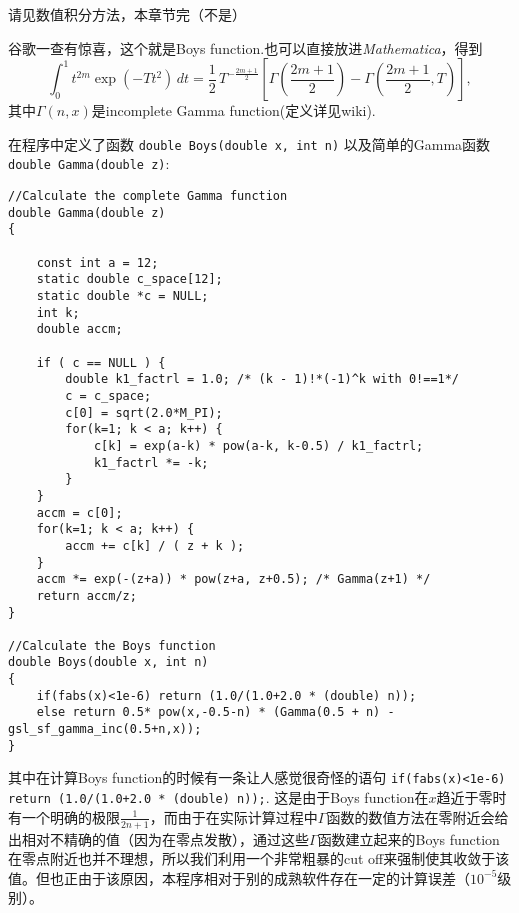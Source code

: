 \documentclass[12pt,a4paper,openany,twoside]{article}
\numberwithin{equation}{section}
\begin{document}
                请见数值积分方法，本章节完（不是）

                谷歌一查有惊喜，这个就是Boys function.也可以直接放进\emph{Mathematica}，得到
                \begin{equation}
                    \int _0^1 t^{2m} \exp(-Tt^2) \, dt = \frac{1}{2} \, T^{-\frac{2m+1}{2}}\left[\Gamma\left(\frac{2m+1}{2}\right) -  \Gamma\left(\frac{2m+1}{2},T\right)\right],
                \end{equation}
                其中$\Gamma(n,x)$是incomplete Gamma function(定义详见wiki).

                在程序中定义了函数 \lstinline$double Boys(double x, int n)$ 以及简单的Gamma函数 \lstinline$double Gamma(double z)$:
                \begin{lstlisting}
//Calculate the complete Gamma function
double Gamma(double z)
{

    const int a = 12;
    static double c_space[12];
    static double *c = NULL;
    int k;
    double accm;

    if ( c == NULL ) {
        double k1_factrl = 1.0; /* (k - 1)!*(-1)^k with 0!==1*/
        c = c_space;
        c[0] = sqrt(2.0*M_PI);
        for(k=1; k < a; k++) {
            c[k] = exp(a-k) * pow(a-k, k-0.5) / k1_factrl;
            k1_factrl *= -k;
        }
    }
    accm = c[0];
    for(k=1; k < a; k++) {
        accm += c[k] / ( z + k );
    }
    accm *= exp(-(z+a)) * pow(z+a, z+0.5); /* Gamma(z+1) */
    return accm/z;
}

//Calculate the Boys function
double Boys(double x, int n)
{
    if(fabs(x)<1e-6) return (1.0/(1.0+2.0 * (double) n));
    else return 0.5* pow(x,-0.5-n) * (Gamma(0.5 + n) - gsl_sf_gamma_inc(0.5+n,x));
}
                \end{lstlisting}
                其中在计算Boys function的时候有一条让人感觉很奇怪的语句 \lstinline$if(fabs(x)<1e-6) return (1.0/(1.0+2.0 * (double) n));$. 这是由于Boys function在$x$趋近于零时有一个明确的极限$\frac{1}{2 n +1}$，而由于在实际计算过程中$\Gamma$函数的数值方法在零附近会给出相对不精确的值（因为在零点发散），通过这些$\Gamma$函数建立起来的Boys function在零点附近也并不理想，所以我们利用一个非常粗暴的cut off来强制使其收敛于该值。但也正由于该原因，本程序相对于别的成熟软件存在一定的计算误差（$10^{-5}$级别）。
\end{document}
